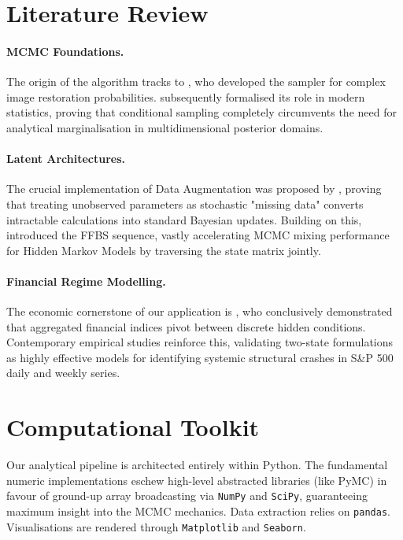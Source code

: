 \documentclass[12pt, a4paper]{article}
\begin{document}
\section{Literature Review}

\paragraph{MCMC Foundations.}
The origin of the algorithm tracks to \citet{geman1984}, who developed the sampler for complex image restoration probabilities. \citet{gelfand1990} subsequently formalised its role in modern statistics, proving that conditional sampling completely circumvents the need for analytical marginalisation in multidimensional posterior domains.

\paragraph{Latent Architectures.}
The crucial implementation of Data Augmentation was proposed by \citet{tanner1987}, proving that treating unobserved parameters as stochastic "missing data" converts intractable calculations into standard Bayesian updates. Building on this, \citet{chib1996} introduced the FFBS sequence, vastly accelerating MCMC mixing performance for Hidden Markov Models by traversing the state matrix jointly.

\paragraph{Financial Regime Modelling.}
The economic cornerstone of our application is \citet{hamilton1989}, who conclusively demonstrated that aggregated financial indices pivot between discrete hidden conditions. Contemporary empirical studies \citep{ozturk2025, yao2025} reinforce this, validating two-state formulations as highly effective models for identifying systemic structural crashes in S\&P 500 daily and weekly series.

\section{Computational Toolkit}

Our analytical pipeline is architected entirely within Python. The fundamental numeric implementations eschew high-level abstracted libraries (like PyMC) in favour of ground-up array broadcasting via \texttt{NumPy} and \texttt{SciPy}, guaranteeing maximum insight into the MCMC mechanics. Data extraction relies on \texttt{pandas}. Visualisations are rendered through \texttt{Matplotlib} and \texttt{Seaborn}.
\end{document}
